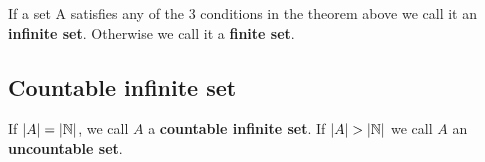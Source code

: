 \begin{definition}
  If a set A satisfies any of the 3 conditions in the theorem
above we call it an \textbf{infinite set}. Otherwise we call it a \textbf{finite set}.
\end{definition}

\subsection{Countable infinite set}

\begin{definition}
  If $|A| = |\mathbb N|$, we call $A$ a \textbf{countable infinite set}. If
  $|A| > |\mathbb N|$ we call $A$ an \textbf{uncountable set}.
\end{definition}


